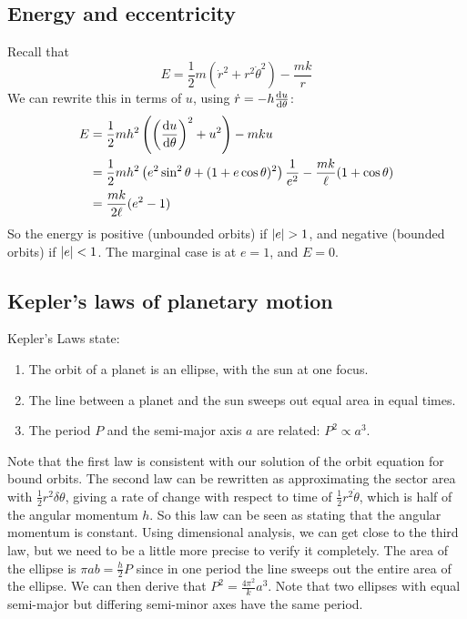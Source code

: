 \subsection{Energy and eccentricity}
Recall that
\[
	E = \frac{1}{2}m\left( \dot r^2 + r^2 \dot\theta^2 \right) - \frac{mk}{r}
\]
We can rewrite this in terms of \(u\), using \(\dot r = -h\dv{u}{\theta}\):
\begin{align*}
	E & = \frac{1}{2}mh^2\left( \left( \dv{u}{\theta} \right)^2 + u^2 \right) - mku                                      \\
	  & = \frac{1}{2}mh^2\left( e^2\sin^2\theta + (1+e\cos\theta)^2 \right)\frac{1}{e^2} - \frac{mk}{\ell}(1+\cos\theta) \\
	  & = \frac{mk}{2\ell}(e^2 - 1)
\end{align*}
So the energy is positive (unbounded orbits) if \(\abs{e} > 1\), and negative (bounded orbits) if \(\abs{e} < 1\).
The marginal case is at \(e = 1\), and \(E = 0\).

\subsection{Kepler's laws of planetary motion}
Kepler's Laws state:
\begin{enumerate}
	\item The orbit of a planet is an ellipse, with the sun at one focus.
	\item The line between a planet and the sun sweeps out equal area in equal times.
	\item The period \(P\) and the semi-major axis \(a\) are related: \(P^2 \propto a^3\).
\end{enumerate}
Note that the first law is consistent with our solution of the orbit equation for bound orbits.
The second law can be rewritten as approximating the sector area with \(\frac{1}{2}r^2\delta\theta\), giving a rate of change with respect to time of \(\frac{1}{2}r^2\dot\theta\), which is half of the angular momentum \(h\).
So this law can be seen as stating that the angular momentum is constant.
Using dimensional analysis, we can get close to the third law, but we need to be a little more precise to verify it completely.
The area of the ellipse is \(\pi a b = \frac{h}{2}P\) since in one period the line sweeps out the entire area of the ellipse.
We can then derive that \(P^2 = \frac{4\pi^2}{k}a^3\).
Note that two ellipses with equal semi-major but differing semi-minor axes have the same period.

